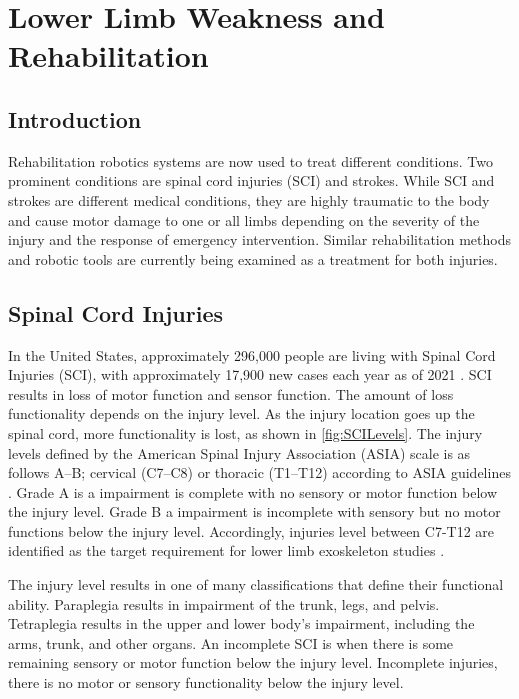 \section{Lower Limb Weakness and Rehabilitation}
\subsection{Introduction}
Rehabilitation robotics systems are now used to treat different conditions. 
Two prominent conditions are spinal cord injuries (SCI) and strokes. While SCI and strokes are different medical conditions, they are highly traumatic to the body and cause motor damage to one or all limbs depending on the severity of the injury and the response of emergency intervention. Similar rehabilitation methods and robotic tools are currently being examined as a treatment for both injuries.  


\subsection{Spinal Cord Injuries}
In the United States, approximately 296,000 people are living with Spinal Cord Injuries (SCI), with approximately 17,900 new cases each year as of 2021 \cite{national2016facts}. SCI results in loss of motor function and sensor function. The amount of loss functionality depends on the injury level. As the injury location goes up the spinal cord, more functionality is lost, as shown in \autoref{fig:SCILevels}. The injury levels defined by the  American Spinal Injury Association (ASIA)  scale is as follows A–B; cervical (C7–C8) or thoracic (T1–T12) according to ASIA guidelines \cite{kirshblum2011international}. Grade A is a impairment is complete with no sensory or motor function below the injury level. Grade B a impairment is incomplete with sensory but no motor functions below the injury level. Accordingly, injuries level between C7-T12 are identified as the target requirement for lower limb exoskeleton studies \cite{esquenazi2012rewalk}. 

The injury level results in one of many classifications that define their functional ability. Paraplegia results in impairment of the trunk, legs, and pelvis. Tetraplegia results in the upper and lower body's impairment, including the arms, trunk, and other organs. An incomplete SCI is when there is some remaining sensory or motor function below the injury level.  Incomplete injuries, there is no motor or sensory functionality below the injury level. 


